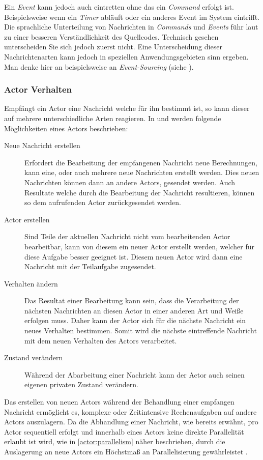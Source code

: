 Ein \textit{Event} kann jedoch auch eintretten ohne das ein \textit{Command} erfolgt ist. Beispielsweise wenn ein \textit{Timer} abläuft oder ein anderes Event im System eintrifft. Die sprachliche Unterteilung von Nachrichten in \textit{Commands} und \textit{Events} führ laut \cite{Evans2004Domain-drivenSoftware} zu einer besseren Verständlichkeit des Quellcodes. Technisch gesehen unterscheiden Sie sich jedoch zuerst nicht. Eine Unterscheidung dieser Nachrichtenarten kann jedoch in speziellen Anwendungsgebieten sinn ergeben. Man denke hier an beispielsweise an \textit{Event-Sourcing} (siehe \cite{betts2013CQRSEventSourcing}).

\subsubsection{Actor Verhalten}
\label{actorBehaviour}
Empfängt ein Actor eine Nachricht welche für ihn bestimmt ist, so kann dieser auf mehrere unterschiedliche Arten reagieren. In \citep{Agha1985ActorsSystems} und \citep{Vernon2015ReactiveAkka} werden folgende Möglichkeiten eines Actors beschrieben:
\begin{description}
    \item[Neue Nachricht erstellen] Erfordert die Bearbeitung der empfangenen Nachricht neue Berechnungen, kann eine, oder auch mehrere neue Nachrichten erstellt werden. Dies neuen Nachrichten können dann an andere Actors, gesendet werden. Auch Resultate welche durch die Bearbeitung der Nachricht resultieren, können so dem aufrufenden Actor zurückgesendet werden.
    \item[Actor erstellen] Sind Teile der aktuellen Nachricht nicht vom bearbeitenden Actor bearbeitbar, kann von diesem ein neuer Actor erstellt werden, welcher für diese Aufgabe besser geeignet ist. Diesem neuen Actor wird dann eine Nachricht mit der Teilaufgabe zugesendet.
    \item[Verhalten ändern] Das Resultat einer Bearbeitung kann sein, dass die Verarbeitung der nächsten Nachrichten an diesen Actor in einer anderen Art und Weiße erfolgen muss. Daher kann der Actor sich für die nächste Nachricht ein neues Verhalten bestimmen. Somit wird die nächste eintreffende Nachricht mit dem neuen Verhalten des Actors verarbeitet.
    \item[Zustand verändern] Während der Abarbeitung einer Nachricht kann der Actor auch seinen eigenen privaten Zustand verändern.
\end{description}
Das erstellen von neuen Actors während der Behandlung einer empfangen Nachricht ermöglicht es, komplexe oder Zeitintensive Rechenaufgaben auf andere Actors auszulagern. Da die Abhandlung einer Nachricht, wie bereits erwähnt, pro Actor sequentiell erfolgt und innerhalb eines Actors keine direkte Parallelität erlaubt ist wird, wie in \ref{actor:parallelism} näher beschrieben, durch die Auslagerung an neue Actors ein Höchstmaß an Parallelisierung gewährleistet \citep{Agha1985ConcurrentParallelism}.

